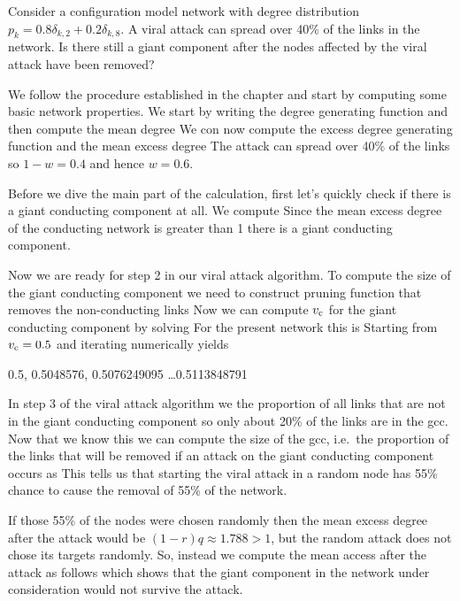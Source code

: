 
Consider a configuration model network with degree distribution $p_k=0.8\delta_{k,2}+0.2 \delta_{k,8}$. A viral attack can spread over 40\% of the links in the network. Is there still a giant component after the nodes affected by the viral attack have been removed? 

\solution 
We follow the procedure established in the chapter and start by computing some basic network properties. We start by writing the degree generating function 
and then compute the mean degree 
We con now compute the excess degree generating function 
and the mean excess degree 
The attack can spread over 40\% of the links so $1-w=0.4$ and hence $w=0.6$.

Before we dive the main part of the calculation, first let's quickly check if there is a giant conducting component at all. We compute 
Since the mean excess degree of the conducting network is greater than 1 there is a giant conducting component. 

Now we are ready for step 2 in our viral attack algorithm. To compute the size of the giant conducting component we need to construct pruning function that removes the non-conducting links
Now we can compute $v_{\rm c}$ for the giant conducting component by solving 
For the present network this is
Starting from $v_{\rm c}=0.5$ and iterating numerically yields
\begin{center}
    0.5, 0.5048576, 0.5076249095 \ldots 0.5113848791 
\end{center}

In step 3 of the viral attack algorithm we the proportion of all links that are not in the giant conducting component
so only about 20\% of the links are in the gcc. Now that we know this we can compute the size of the gcc, i.e.~the proportion of the links that will be removed if an attack on the giant conducting component occurs as
This tells us that starting the viral attack in a random node has 55\% chance to cause the removal of 55\% of the network. 

If those 55\% of the nodes were chosen randomly then the mean excess degree after the attack would be $(1-r)q\approx 1.788>1$, but the random attack does not chose its targets randomly. So, instead we compute the mean access after the attack as follows 
which shows that the giant component in the network under consideration would not survive the attack. 
